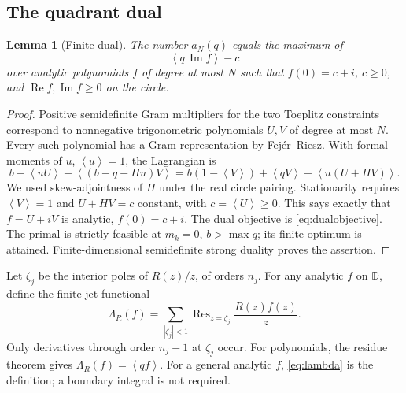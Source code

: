 \documentclass[11pt,a4paper]{article}
\newtheorem{lemma}[theorem]{Lemma}
\theoremstyle{remark}\newtheorem{remark}[theorem]{Remark}
\newcommand{\D}{\mathbb D}
\newcommand{\av}[1]{\left\langle #1\right\rangle}
\newcommand{\Rea}{\operatorname{Re}}
\newcommand{\Ima}{\operatorname{Im}}
\newcommand{\Res}{\operatorname{Res}}
\begin{document}
\subsection{The quadrant dual}
\begin{lemma}[Finite dual]\label{lem:dual}
The number \(a_N(q)\) equals the maximum of
\begin{equation}\label{eq:dualobjective}
 \av{q\,\Ima f}-c
\end{equation}
over analytic polynomials \(f\) of degree at most \(N\) such that
\(f(0)=c+i\), \(c\geq0\), and \(\Rea f,\Ima f\geq0\) on the circle.
\end{lemma}
\begin{proof}
Positive semidefinite Gram multipliers for the two Toeplitz
constraints correspond to nonnegative trigonometric polynomials
\(U,V\) of degree at most \(N\). Every such polynomial has a Gram
representation by Fej\'er--Riesz. With formal moments of \(u\),
\(\av{u}=1\), the Lagrangian is
\[
 b-\av{uU}-\av{(b-q-Hu)V}
 =b(1-\av V)+\av{qV}-\av{u(U+HV)}.
\]
We used skew-adjointness of \(H\) under the real circle pairing.
Stationarity requires \(\av V=1\) and \(U+HV=c\) constant,
with \(c=\av U\geq0\). This says exactly that \(f=U+iV\) is
analytic, \(f(0)=c+i\). The dual objective is \eqref{eq:dualobjective}.
The primal is strictly feasible at \(m_k=0\), \(b>\max q\);
its finite optimum is attained. Finite-dimensional semidefinite
strong duality proves the assertion.
\end{proof}

Let \(\zeta_j\) be the interior poles of \(R(z)/z\), of orders
\(n_j\). For any analytic \(f\) on \(\D\), define the finite jet functional
\begin{equation}\label{eq:lambda}
 \Lambda_R(f)=\sum_{|\zeta_j|<1}
       \Res_{z=\zeta_j}\frac{R(z)f(z)}{z}.
\end{equation}
Only derivatives through order \(n_j-1\) at \(\zeta_j\) occur.
For polynomials, the residue theorem gives
\(\Lambda_R(f)=\av{qf}\). For a general analytic \(f\),
\eqref{eq:lambda} is the definition; a boundary integral is not required.
\end{document}
